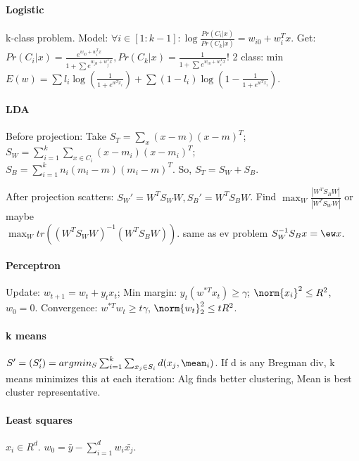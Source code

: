 \documentclass[10pt]{article}
\begin{document}
\paragraph*{Logistic}
k-class problem. Model: $\forall i\in [1:k-1]: \log\frac{Pr(C_{i}|x)}{Pr(C_{k}|x)} = w_{i0} + w_{i}^{T}x$. Get: $Pr(C_{i}|x) = \frac{e^{w_{i0}+ w_{i}^{T}x}}{1 + \sum e^{w_{j0}+ w_{j}^{T}x}}, Pr(C_{k}|x) = \frac{1}{1 + \sum e^{w_{i0}+ w_{i}^{T}x}}$! 2 class: min $E(w) = \sum  l_{i} \log (\frac{1}{1+e^{w^{T}x_{i}}}) + \sum (1-l_{i}) \log (1-\frac{1}{1+e^{w^{T}x_{i}}})$. 

\paragraph*{LDA}
Before projection: Take $S_{T} = \sum_{x}(x - m)(x - m)^{T}$; $S_{W} = \sum_{i=1}^{k} \sum_{x \in C_{i}}(x - m_{i})(x - m_{i})^{T}$; $S_{B} = \sum_{i=1}^{k}n_{i}(m_{i}-m)(m_{i}-m)^{T}$. So, $S_{T} = S_{W} + S_{B}$.

After projection scatters: $S_{W}' = W^{T}S_{W}W, S_{B}' = W^{T}S_{B}W$. Find $\max_{W} \frac{|W^{T}S_{B}W|}{|W^{T}S_{W}W|}$ or maybe \\
$\max_{W} tr((W^{T}S_{W}W)^{-1}(W^{T}S_{B}W))$. same as ev problem $S_{W}^{-1}S_Bx = \ew x$.

\paragraph*{Perceptron}
Update: $w_{t+1} = w_{t} + y_{t}x_{t}$; Min margin: $y_{t}(w^{*T}x_{t}) \geq \gamma$; $\norm{x_{i}}^{2} \leq R^{2}$, $w_0 = 0$. Convergence: $w^{*T}w_{t} \geq t\gamma$, $\norm{w_{t}}_{2}^{2} \leq tR^{2}$.

\paragraph*{k means}
$S' = (S_{i}') = argmin_{S} \sum_{i=1}^{k} \sum_{x_{j} \in S_{i}} d(x_{j}, \mean_{i})$. If d is any Bregman div, k means minimizes this at each iteration: Alg finds better clustering, Mean is best cluster representative.

\paragraph*{Least squares}
$x_{i}\in R^{d}$. $w_{0} = \bar{y} - \sum_{i=1}^{d} w_{i}\bar{x_{j}}$.

% 
% 
% 
\end{document}
